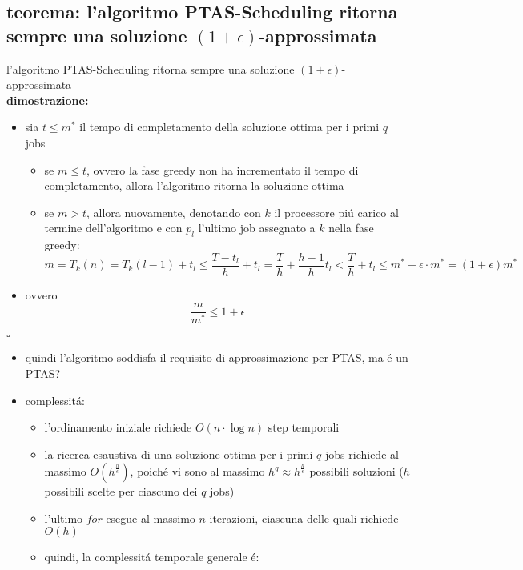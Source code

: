 \subsection*{teorema: l'algoritmo PTAS-Scheduling ritorna sempre una soluzione $(1+\epsilon)$-approssimata} 
\begin{flushleft}
	l'algoritmo PTAS-Scheduling ritorna sempre una soluzione $(1+\epsilon)$-approssimata \newline \\
	\textbf{dimostrazione:}
	\begin{itemize}
		\item sia $t\leq m^*$ il tempo di completamento della soluzione ottima per i primi $q$ jobs
		\begin{itemize}
			\item se $m\leq t$, ovvero la fase greedy non ha incrementato il tempo di completamento, allora l'algoritmo ritorna la soluzione ottima
			\item se $m>t$, allora nuovamente, denotando con $k$ il processore pi\'u carico al termine dell'algoritmo e con $p_l$ l'ultimo job assegnato a $k$ nella fase greedy:
				$$m=T_k(n)=T_k(l-1)+t_l\leq\frac{T-t_l}{h}+t_l=\frac{T}{h}+\frac{h-1}{h}t_l<\frac{T}{h}+t_l\leq m^*+\epsilon\cdot m^*=(1+\epsilon)m^*$$
		\end{itemize}
		\item ovvero
			$$\frac{m}{m^*}\leq 1+\epsilon$$
	\end{itemize}
	\hfill$\square$
	\begin{itemize}
		\item quindi l'algoritmo soddisfa il requisito di approssimazione per PTAS, ma \'e un PTAS?
		\item complessit\'a:
		\begin{itemize}
			\item l'ordinamento iniziale richiede $O(n\cdot\log n)$ step temporali
			\item la ricerca esaustiva di una soluzione ottima per i primi $q$ jobs richiede al massimo $O(h^\frac{h}{\epsilon})$, poich\'e vi sono al  massimo $h^q\approx h^\frac{h}{\epsilon}$ possibili soluzioni ($h$ possibili scelte per ciascuno dei $q$ jobs)
			\item l'ultimo $for$ esegue al massimo $n$ iterazioni, ciascuna delle quali richiede $O(h)$
			\item quindi, la complessit\'a temporale generale \'e:

\end{itemize}
\end{itemize}
\end{flushleft}
